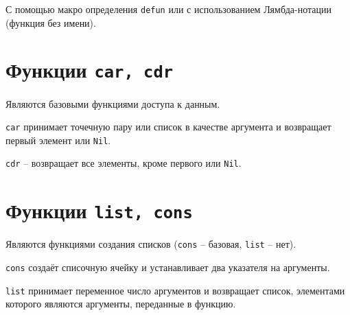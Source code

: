 С помощью макро определения \texttt{defun} или с использованием Лямбда-нотации (функция без имени).

\section*{Функции {\texttt{car, cdr}}}

Являются базовыми функциями доступа к данным. 

{\texttt{car}} принимает точечную пару или список в качестве аргумента и возвращает первый элемент или {\texttt{Nil}}.

{\texttt{cdr}} -- возвращает все элементы, кроме первого или {\texttt{Nil}}.

\section*{Функции {\texttt{list, cons}}}

Являются функциями создания списков ({\texttt{cons}} -- базовая, {\texttt{list}} -- нет). 

{\texttt{cons}} создаёт списочную ячейку и устанавливает два указателя на аргументы. 

{\texttt{list}} принимает переменное число аргументов и возвращает список, элементами которого являются аргументы, переданные в функцию.
